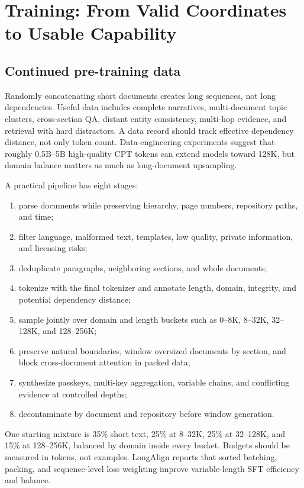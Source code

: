 \documentclass[UTF8,10pt,a4paper,fontset=none]{ctexart}
\begin{document}
\section{Training: From Valid Coordinates to Usable Capability}

\subsection{Continued pre-training data}
Randomly concatenating short documents creates long sequences, not long dependencies. Useful data includes complete narratives, multi-document topic clusters, cross-section QA, distant entity consistency, multi-hop evidence, and retrieval with hard distractors. A data record should track effective dependency distance, not only token count. Data-engineering experiments suggest that roughly 0.5B--5B high-quality CPT tokens can extend models toward 128K, but domain balance matters as much as long-document upsampling\cite{fu2024data}.

A practical pipeline has eight stages:
\begin{enumerate}
\item parse documents while preserving hierarchy, page numbers, repository paths, and time;
\item filter language, malformed text, templates, low quality, private information, and licensing risks;
\item deduplicate paragraphs, neighboring sections, and whole documents;
\item tokenize with the final tokenizer and annotate length, domain, integrity, and potential dependency distance;
\item sample jointly over domain and length buckets such as 0--8K, 8--32K, 32--128K, and 128--256K;
\item preserve natural boundaries, window oversized documents by section, and block cross-document attention in packed data;
\item synthesize passkeys, multi-key aggregation, variable chains, and conflicting evidence at controlled depths;
\item decontaminate by document and repository before window generation.
\end{enumerate}

One starting mixture is 35\% short text, 25\% at 8--32K, 25\% at 32--128K, and 15\% at 128--256K, balanced by domain inside every bucket. Budgets should be measured in tokens, not examples. LongAlign reports that sorted batching, packing, and sequence-level loss weighting improve variable-length SFT efficiency and balance\cite{bai2024longalign}.
\end{document}
